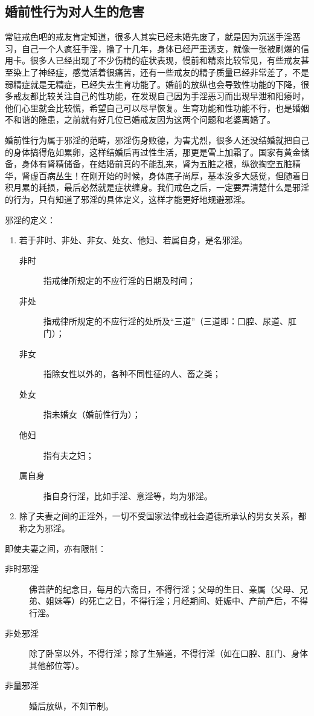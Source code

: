 \documentclass{ctexart}
\begin{document}
\subsection{婚前性行为对人生的危害}

常驻戒色吧的戒友肯定知道，很多人其实已经未婚先废了，就是因为沉迷手淫恶习，自己一个人疯狂手淫，撸了十几年，身体已经严重透支，就像一张被刷爆的信用卡。很多人已经出现了不少伤精的症状表现，慢前和精索比较常见，有些戒友甚至染上了神经症，感觉活着很痛苦，还有一些戒友的精子质量已经非常差了，不是弱精症就是无精症，已经失去生育功能了。婚前的放纵也会导致性功能的下降，很多戒友都比较关注自己的性功能，在发现自己因为手淫恶习而出现早泄和阳痿时，他们心里就会比较慌，希望自己可以尽早恢复。生育功能和性功能不行，也是婚姻不和谐的隐患，之前就有好几位已婚戒友因为这两个问题和老婆离婚了。

婚前性行为属于邪淫的范畴，邪淫伤身败德，为害尤烈，很多人还没结婚就把自己的身体搞得危如累卵，这样结婚后再过性生活，那更是雪上加霜了。国家有黄金储备，身体有肾精储备，在结婚前真的不能乱来，肾为五脏之根，纵欲掏空五脏精华，肾虚百病丛生！在刚开始的时候，身体底子尚厚，基本没多大感觉，但随着日积月累的耗损，最后必然就是症状缠身。我们戒色之后，一定要弄清楚什么是邪淫的行为，只有知道了邪淫的具体定义，这样才能更好地规避邪淫。

邪淫的定义：

\begin{enumerate}
    \item 若于非时、非处、非女、处女、他妇、若属自身，是名邪淫。\begin{description}
              \item[非时] 指戒律所规定的不应行淫的日期及时间；
              \item[非处] 指戒律所规定的不应行淫的处所及“三道”（三道即：口腔、尿道、肛门）；
              \item[非女] 指除女性以外的，各种不同性征的人、畜之类；
              \item[处女] 指未婚女（婚前性行为）；
              \item[他妇] 指有夫之妇；
              \item[属自身] 指自身行淫，比如手淫、意淫等，均为邪淫。
          \end{description}
    \item 除了夫妻之间的正淫外，一切不受国家法律或社会道德所承认的男女关系，都称之为邪淫。
\end{enumerate}

即使夫妻之间，亦有限制：

\begin{description}
    \item[非时邪淫] 佛菩萨的纪念日，每月的六斋日，不得行淫；父母的生日、亲属（父母、兄弟、姐妹等）的死亡之日，不得行淫；月经期间、妊娠中、产前产后，不得行淫。
    \item[非处邪淫] 除了卧室以外，不得行淫；除了生殖道，不得行淫（如在口腔、肛门、身体其他部位等）。
    \item[非量邪淫] 婚后放纵，不知节制。
\end{description}
\end{document}
